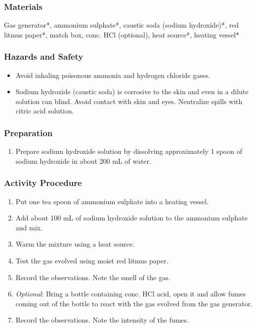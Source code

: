 \subsubsection*{Materials}
Gas generator*, ammonium sulphate*, caustic soda (sodium hydroxide)*, red litmus paper*, match box, conc. HCl (optional), heat source*, heating vessel*

\subsubsection*{Hazards and Safety}
\begin{itemize}
\item{Avoid inhaling poisonous ammonia and hydrogen chloride gases.}
\item{Sodium hydroxide (caustic soda) is corrosive to the skin and even in a dilute solution can blind. Avoid contact with skin and eyes. Neutralize spills with citric acid solution.}
\end{itemize}

\subsubsection*{Preparation}
\begin{enumerate}
\item{Prepare sodium hydroxide solution by dissolving approximately 1 spoon of sodium hydroxide in about 200 mL of water.}
\end{enumerate}

\subsubsection*{Activity Procedure}
\begin{enumerate}
\item{Put one tea spoon of ammonium sulphate into a heating vessel.}
\item{Add about 100 mL of sodium hydroxide solution to the ammonium sulphate and mix.}
\item{Warm the mixture using a heat source.}
\item{Test the gas evolved using moist red litmus paper.}
\item{Record the observations. Note the smell of the gas.}
\item{\textit{Optional}: Bring a bottle containing conc. HCl acid, open it and allow fumes coming out of the bottle to react with the gas evolved from the gas generator.}
\item{Record the observations. Note the intensity of the fumes.}
\end{enumerate}



